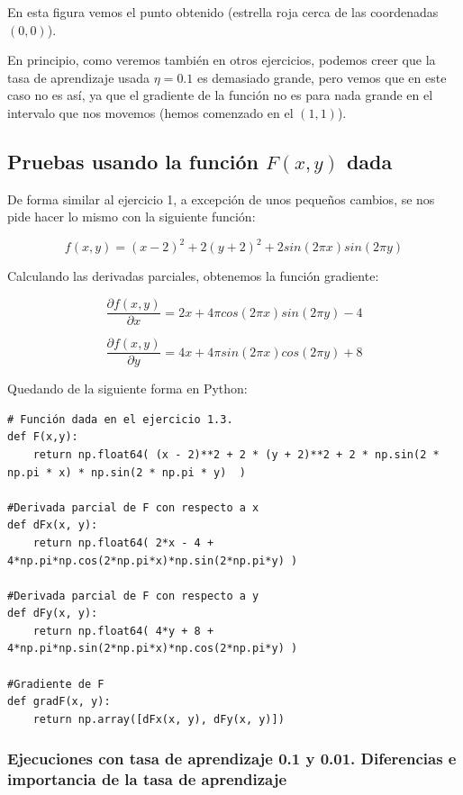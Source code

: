 \documentclass[12pt, spanish]{article}
\begin{document}
En esta figura vemos el punto obtenido (estrella roja cerca de las coordenadas $(0,0)$).

En principio, como veremos también en otros ejercicios, podemos creer que la tasa de aprendizaje usada $\eta = 0.1 $ es demasiado grande, pero vemos que en este caso no es así, ya que el gradiente de la función no es para nada grande en el intervalo que nos movemos (hemos comenzado en el $(1, 1)$).

\newpage

\subsection{Pruebas usando la función $F(x,y)$ dada}

De forma similar al ejercicio 1, a excepción de unos pequeños cambios, se nos pide hacer lo mismo con la siguiente función:

$$ f(x,y) = (x-2)^2 + 2(y+2)^2 + 2sin(2\pi x)sin(2 \pi y) $$

Calculando las derivadas parciales, obtenemos la función gradiente:

$$\frac{\partial  f(x,y)}{\partial x} =    2x + 4\pi cos(2\pi x)sin(2\pi y) - 4  $$

$$\frac{\partial  f(x,y)}{\partial y} =    4x + 4\pi sin(2\pi x)cos(2\pi y) + 8  $$

Quedando de la siguiente forma en Python:

\begin{lstlisting}
# Función dada en el ejercicio 1.3.
def F(x,y):
	return np.float64( (x - 2)**2 + 2 * (y + 2)**2 + 2 * np.sin(2 * np.pi * x) * np.sin(2 * np.pi * y)  ) 

#Derivada parcial de F con respecto a x
def dFx(x, y):
    return np.float64( 2*x - 4 + 4*np.pi*np.cos(2*np.pi*x)*np.sin(2*np.pi*y) )

#Derivada parcial de F con respecto a y
def dFy(x, y):
    return np.float64( 4*y + 8 + 4*np.pi*np.sin(2*np.pi*x)*np.cos(2*np.pi*y) )

#Gradiente de F
def gradF(x, y):
    return np.array([dFx(x, y), dFy(x, y)])

\end{lstlisting}

\newpage

\subsubsection{Ejecuciones con tasa de aprendizaje 0.1 y 0.01. Diferencias e importancia de la tasa de aprendizaje}
\end{document}
